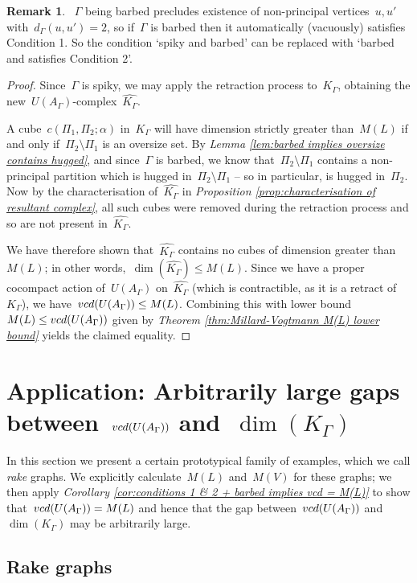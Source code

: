 \documentclass[11pt]{amsart}
\theoremstyle{definition}
\theoremstyle{definition}
\theoremstyle{definition}
\theoremstyle{definition}
\newtheorem{remark}[theorem]{Remark}
\newcommand{\uag}{U(A_{\Gamma})} %
\newcommand{\vcduag}{\textsc{vcd}(U(A_{\Gamma}))} %
\newcommand{\spine}{K_{\Gamma}} %
\newcommand{\res}{\widehat{K_\Gamma}} %
\begin{document}
\begin{remark}
   ~$\Gamma$ being barbed precludes existence of non-principal vertices~$u, u'$ with~$d_\Gamma(u, u') = 2$, so if~$\Gamma$ is barbed then it automatically (vacuously) satisfies Condition 1. So the condition `spiky and barbed' can be replaced with `barbed and satisfies Condition 2'.
\end{remark}

\begin{proof}
    Since~$\Gamma$ is spiky, we may apply the retraction process to~$\spine$, obtaining the new~$\uag$-complex~$\res$. 
    
    A cube~$c(\Pi_1, \Pi_2; \alpha)$ in~$\spine$ will have dimension strictly greater than~$M(L)$ if and only if~$\Pi_2 \setminus \Pi_1$ is an oversize set. By \textit{Lemma \ref{lem:barbed implies oversize contains hugged}}, and since~$\Gamma$ is barbed, we know that~$\Pi_2 \setminus \Pi_1$ contains a non-principal partition which is hugged in~$\Pi_2 \setminus \Pi_1$ -- so in particular, is hugged in~$\Pi_2$. Now by the characterisation of~$\res$ in \textit{Proposition \ref{prop:characterisation of resultant complex}}, all such cubes were removed during the retraction process and so are not present in~$\res$. 

    We have therefore shown that~$\res$ contains no cubes of dimension greater than~$M(L)$; in other words,~$\dim(\res) \leq M(L)$. Since we have a proper cocompact action of~$\uag$ on~$\res$ (which is contractible, as it is a retract of~$\spine$), we have~$\vcduag \leq M(L)$. Combining this with lower bound~$M(L) \leq \vcduag$ given by \textit{Theorem \ref{thm:Millard-Vogtmann M(L) lower bound}} yields the claimed equality.
\end{proof}

\section{Application: Arbitrarily large gaps between~$\vcduag$ and~$\dim(\spine)$}\label{sec:arbitrarily large gaps}

In this section we present a certain prototypical family of examples, which we call \emph{rake} graphs. We explicitly calculate~$M(L)$ and~$M(V)$ for these graphs; we then apply \emph{Corollary \ref{cor:conditions 1 & 2 + barbed implies vcd = M(L)}} to show that~$\vcduag = M(L)$ and hence that the gap between~$\vcduag$ and~$\dim(\spine)$ may be arbitrarily large. 

\subsection{Rake graphs}\label{subsec:rakes}
\end{document}
